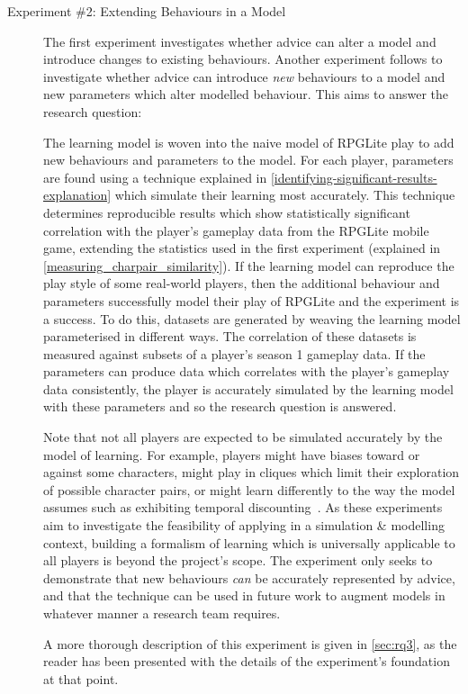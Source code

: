 \begin{description}
  \item[Experiment \#2: Extending Behaviours in a Model] The first experiment
investigates whether advice can alter a model and introduce changes to existing
behaviours. Another experiment follows to investigate whether advice can
introduce \emph{new} behaviours to a model and new parameters which alter
modelled behaviour. This aims to answer the research question:
\emph{\rqtwo{}}

The learning model is woven into the naive model of RPGLite play to add new
behaviours and parameters to the model. For each player, parameters are found
using a technique explained in
\cref{identifying-significant-results-explanation} which simulate their learning
most accurately. This technique determines reproducible results which show
statistically significant correlation with the player's gameplay data from the
RPGLite mobile game, extending the statistics used in the first experiment
(explained in \cref{measuring_charpair_similarity}). If the learning model can
reproduce the play style of some real-world players, then the additional
behaviour and parameters successfully model their play of RPGLite and the
experiment is a success. To do this, datasets are generated by weaving the
learning model parameterised in different ways. The correlation of these
datasets is measured against subsets of a player's season 1 gameplay data. If
the parameters can produce data which correlates with the player's gameplay data
consistently, the player is accurately simulated by the learning model with
these parameters and so the research question is answered.

Note that not all players are expected to be simulated accurately by the model
of learning. For example, players might have biases toward or against some
characters, might play in cliques which limit their exploration of possible
character pairs, or might learn differently to the way the model assumes such as
exhibiting temporal
discounting~\cite{green1996exponential_versus_hyperbolic_discounting}. As these
experiments aim to investigate the feasibility of applying \aop{} in a
simulation \& modelling context, building a formalism of learning which is
universally applicable to all players is beyond the project's scope. The
experiment only seeks to demonstrate that new behaviours \emph{can} be
accurately represented by advice, and that the technique can be used in future
work to augment models in whatever manner a research team requires.

A more thorough description of this experiment is given in \cref{sec:rq3}, as the
reader has been presented with the details of the experiment's foundation at
that point.




\end{description}
